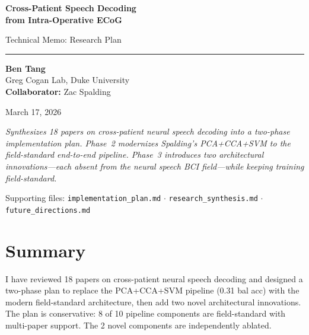 \documentclass[11pt, letterpaper]{article}
\begin{document}

\thispagestyle{empty}
\begin{center}
\vspace*{2cm}

{\Huge\bfseries\color{NavyBlue} Cross-Patient Speech Decoding\\[6pt] from Intra-Operative \textmu ECoG}

\vspace{1.2cm}
{\Large Technical Memo: Research Plan}

\vspace{1.5cm}
\textcolor{gray!60}{\rule{12cm}{0.8pt}}
\vspace{1cm}

{\large
\textbf{Ben Tang}\\[4pt]
Greg Cogan Lab, Duke University\\[12pt]
\textbf{Collaborator:} Zac Spalding
}

\vspace{1cm}
{\large March 17, 2026}

\vspace{2cm}
\begin{minipage}{13cm}
\textcolor{gray!80}{\itshape
Synthesizes 18 papers on cross-patient neural speech decoding into a two-phase implementation plan. Phase~2 modernizes Spalding's PCA+CCA+SVM to the field-standard end-to-end pipeline. Phase~3 introduces two architectural innovations---each absent from the neural speech BCI field---while keeping training field-standard.}
\end{minipage}

\vfill
\textcolor{gray!40}{\small Supporting files:
\texttt{implementation\_plan.md} $\cdot$
\texttt{research\_synthesis.md} $\cdot$
\texttt{future\_directions.md}}
\end{center}

\newpage
\setcounter{page}{1}

\tableofcontents
\newpage

\section{Summary}

I have reviewed 18 papers on cross-patient neural speech decoding and designed a two-phase plan to replace the PCA+CCA+SVM pipeline (0.31 bal acc) with the modern field-standard architecture, then add two novel architectural innovations. The plan is conservative: 8 of 10 pipeline components are field-standard with multi-paper support. The 2 novel components are independently ablated.
\end{document}
